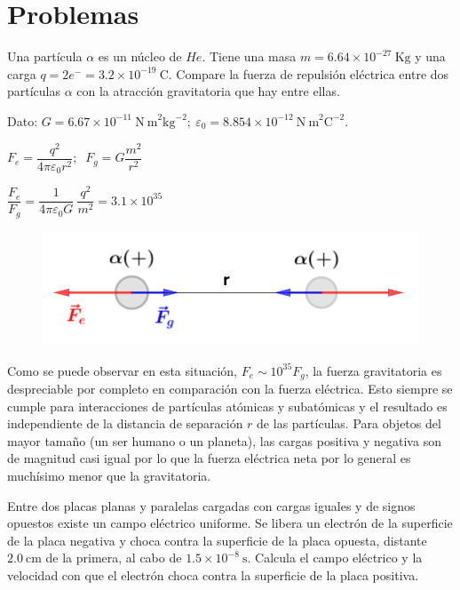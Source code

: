 \section{Problemas}
\begin{prob}
	\normalsize{Una partícula $\alpha$ es un núcleo de $He$. Tiene una masa $m=6.64\times 10^{-27}\ \mathrm{Kg}$ y una carga $q=2e^-=3.2\times 10^{-19}\ \mathrm{C}$. Compare la fuerza de repulsión eléctrica entre dos partículas $\alpha$ con la atracción gravitatoria que hay entre ellas.}
	
	Dato: $G=6.67\times 10^{-11}\ \mathrm{N\ m}^2 \mathrm{kg}^{-2};\ \varepsilon_0=8.854\times 10^{-12} \ \mathrm{N\ m}^2 \mathrm{C}^{-2}$.
\end{prob}
\begin{multicols}{2}
$F_e=\dfrac {q^2} {4\pi \varepsilon_0 r^2};\ $
$F_g=G\dfrac{m^2}{r^2}$

$ \dfrac {F_e} {F_g}=\dfrac {1}{4\pi \varepsilon_0 G} \ \dfrac {q^2}{m^2}= 3.1\times 10^{35}$
\begin{figure}[H]
	\centering
	\includegraphics[width=.5\textwidth]{imagenes/imagenes22/T22IM15.png}
\end{figure}	
\end{multicols}

Como se puede observar en esta situación, $F_e \sim 10^{35} F_g$, la fuerza gravitatoria es despreciable por completo en comparación con la fuerza eléctrica. Esto siempre se cumple para interacciones de partículas atómicas y subatómicas y el resultado es independiente de la distancia de separación $r$ de las partículas. Para objetos del mayor tamaño (un ser humano o un planeta), las cargas positiva y negativa son de magnitud casi igual por lo que la fuerza eléctrica neta por lo general es muchísimo menor que la gravitatoria.

\begin{prob}
Entre dos placas planas y paralelas cargadas con cargas iguales y de signos opuestos existe un campo eléctrico uniforme. Se libera un electrón de la superficie de la placa negativa y choca contra la superficie de la placa opuesta, distante $2.0\ \mathrm{cm}$	de la primera, al cabo de $1.5\times 10^{-8}\ \mathrm{s}$. Calcula el campo eléctrico y la velocidad con que el electrón choca contra la superficie de la placa positiva.
\end{prob}

